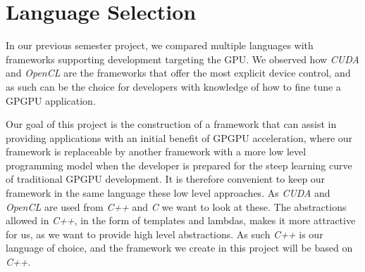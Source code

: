 \section{Language Selection}\label{cha:languageSelection}
In our previous semester project\cite{sw9Report}, we compared multiple languages with frameworks supporting development targeting the GPU. We observed how \textit{CUDA} and \textit{OpenCL} are the frameworks that offer the most explicit device control, and as such can be the choice for developers with knowledge of how to fine tune a GPGPU application.

Our goal of this project is the construction of a framework that can assist in providing applications with an initial benefit of GPGPU acceleration, where our framework is replaceable by another framework with a more low level programming model when the developer is prepared for the steep learning curve of traditional GPGPU development. It is therefore convenient to keep our framework in the same language these low level approaches. As \textit{CUDA} and \textit{OpenCL} are used from \textit{C++} and \textit{C} we want to look at these. The abstractions allowed in \textit{C++}, in the form of templates and lambdas, makes it more attractive for us, as we want to provide high level abstractions. As such \textit{C++} is our language of choice, and the framework we create in this project will be based on \textit{C++}.

